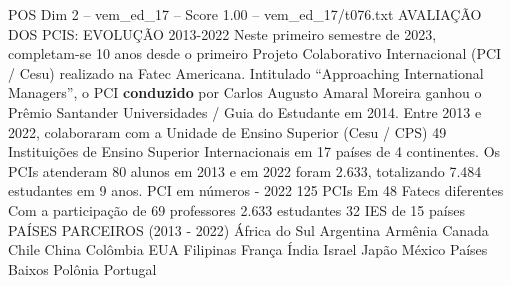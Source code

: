 \begin{textsample}{POS Dim 2 – vem\_ed\_17 – Score 1.00 – vem\_ed\_17/t076.txt}  \label{ex:f2_pos_129}
AVALIAÇÃO DOS PCIS: EVOLUÇÃO 2013-2022 Neste primeiro semestre de 2023, completam-se 10 anos desde o primeiro Projeto Colaborativo Internacional (PCI / Cesu) realizado na Fatec Americana.
Intitulado “Approaching International Managers”, o PCI \textbf{conduzido} por Carlos Augusto Amaral Moreira ganhou o Prêmio Santander Universidades / Guia do Estudante em 2014.
Entre 2013 e 2022, colaboraram com a Unidade de Ensino Superior (Cesu / CPS) 49 Instituições de Ensino Superior Internacionais em 17 países de 4 continentes.
Os PCIs atenderam 80 alunos em 2013 e em 2022 foram 2.633, totalizando 7.484 estudantes em 9 anos.
PCI em números - 2022 125 PCIs Em 48 Fatecs diferentes Com a participação de 69 professores 2.633 estudantes 32 IES de 15 países PAÍSES PARCEIROS (2013 - 2022) África do Sul Argentina Armênia Canada Chile China Colômbia EUA Filipinas França Índia Israel Japão México Países Baixos Polônia Portugal

\end{textsample}

